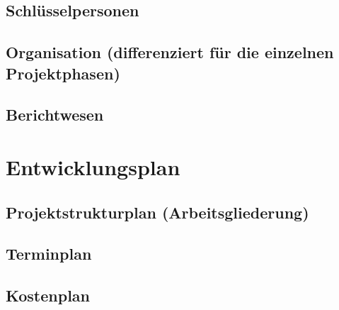 \documentclass[a4paper,10pt]{scrartcl}
\begin{document}
\subsection{Schlüsselpersonen}
\subsection{Organisation (differenziert für die einzelnen Projektphasen)}
\subsection{Berichtwesen}


\section{Entwicklungsplan}
\subsection{Projektstrukturplan (Arbeitsgliederung)}
\subsection{Terminplan}
\subsection{Kostenplan}
\end{document}
